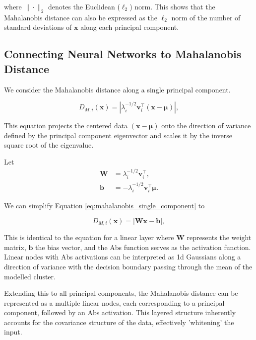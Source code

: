 where $\| \cdot \|_2$ denotes the Euclidean ($\ell_2$) norm. This shows that the Mahalanobis distance can also be expressed as the $\ell_2$ norm of the number of standard deviations of \(\mathbf{x}\) along each principal component.

\subsection{Connecting Neural Networks to Mahalanobis Distance}

We consider the Mahalanobis distance along a single principal component.

\begin{equation}
    \label{eq:mahalanobis_single_component}
    D_{M,i}(\mathbf{x}) = \left| \lambda_i^{-1/2} \mathbf{v}_i^\top (\mathbf{x} - \boldsymbol{\mu}) \right|,
\end{equation}

This equation projects the centered data $(\mathbf{x} - \boldsymbol{\mu})$ onto the direction of variance defined by the principal component eigenvector and scales it by the inverse square root of the eigenvalue.

Let 
\begin{align}
    \mathbf{W} &= \lambda_i^{-1/2} \mathbf{v}_i^\top, \\
    \mathbf{b} &= - \lambda_i^{-1/2} \mathbf{v}_i^\top \boldsymbol{\mu}.
\end{align}

We can simplify Equation \eqref{eq:mahalanobis_single_component} to

\begin{equation}
    \label{eq:mahalanobis_linear}
    D_{M,i}(\mathbf{x}) = \left| \mathbf{W} \mathbf{x} - \mathbf{b} \right|,
\end{equation}

This is identical to the equation for a linear layer where $\boldsymbol{W}$ represents the weight matrix, $\boldsymbol{b}$ the bias vector, and the Abs function serves as the activation function. Linear nodes with Abs activations can be interpreted as 1d Gaussians along a direction of variance with the decision boundary passing through the mean of the modelled cluster. 

Extending this to all principal components, the Mahalanobis distance can be represented as a multiple linear nodes, each corresponding to a principal component, followed by an Abs activation. This layered structure inherently accounts for the covariance structure of the data, effectively 'whitening' the input.

